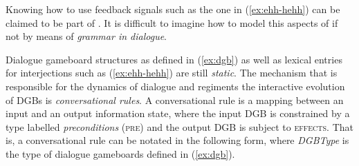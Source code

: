 \documentclass[output=paper
	        ,collection
	        ,collectionchapter
 	        ,biblatex
                ,babelshorthands
                ,newtxmath
                ,draftmode
                ,colorlinks, citecolor=brown
]{langscibook}
\begin{document}
Knowing how  to use feedback signals   such as the one in (\ref{ex:ehh-hehh}) can be claimed to be part of .
%
It is difficult to imagine how to model this aspects of  if not by means of \emph{grammar in dialogue}.


Dialogue gameboard structures as defined in (\ref{ex:dgb}) as well as lexical entries for interjections such as (\ref{ex:ehh-hehh}) are still \emph{static}.
%
The mechanism that is responsible for the dynamics of dialogue and regiments the interactive evolution of DGBs is \emph{conversational rules}.
%
A conversational rule is a mapping between an input and an output information state, where the input DGB is constrained by a type labelled \emph{preconditions} (\textsc{pre})  and the output DGB is subject to \textsc{effects}.
%
That is, a conversational rule can be notated in the following form, where \emph{DGBType} is the type of dialogue gameboards defined in (\ref{ex:dgb}).
%
\ea \label{ex:pre-effect}
\z
\end{document}
